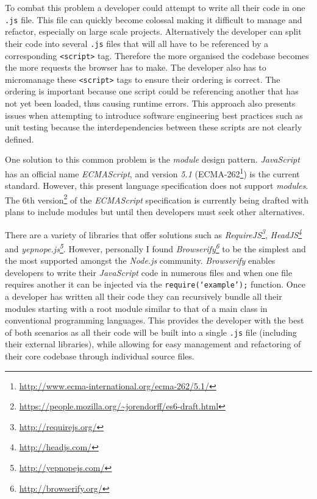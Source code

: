 \documentclass[final]{cmpreport}
\begin{document}
To combat this problem a developer could attempt to write all their code in one \texttt{.js} file. This file can quickly become colossal making it difficult to manage and refactor, especially on large scale projects. Alternatively the developer can split their code into several \texttt{.js} files that will all have to be referenced by a corresponding \texttt{<script>} tag. Therefore the more organised the codebase becomes the more requests the browser has to make. The developer also has to micromanage these \texttt{<script>} tags to ensure their ordering is correct. The ordering is important because one script could be referencing another that has not yet been loaded, thus causing runtime errors. This approach also presents issues when attempting to introduce software engineering best practices such as unit testing because the interdependencies between these scripts are not clearly defined.

One solution to this common problem is the \textit{module} design pattern. \textit{JavaScript} has an official name \textit{ECMAScript}, and version \textit{5.1} (ECMA-262\footnote{\url{http://www.ecma-international.org/ecma-262/5.1/}}) is the current standard. However, this present language specification does not support \textit{modules}. The 6th version\footnote{\url{https://people.mozilla.org/~jorendorff/es6-draft.html}} of the \textit{ECMAScript} specification is currently being drafted with plans to include modules but until then developers must seek other alternatives.

There are a variety of libraries that offer solutions such as \textit{RequireJS\footnote{\url{http://requirejs.org/}}}, \textit{HeadJS\footnote{\url{http://headjs.com/}}} and \textit{yepnope.js\footnote{\url{http://yepnopejs.com/}}}. However, personally I found \textit{Browserify\footnote{\url{http://browserify.org/}}} to be the simplest and the most supported amongst the \textit{Node.js} community. \textit{Browserify} enables developers to write their \textit{JavaScript} code in numerous files and when one file requires another it can be injected via the \texttt{require(`example');} function. Once a developer has written all their code they can recursively bundle all their modules starting with a root module similar to that of a main class in conventional programming languages. This provides the developer with the best of both scenarios as all their code will be built into a single \texttt{.js} file (including their external libraries), while allowing for easy management and refactoring of their core codebase through individual source files.
\end{document}

